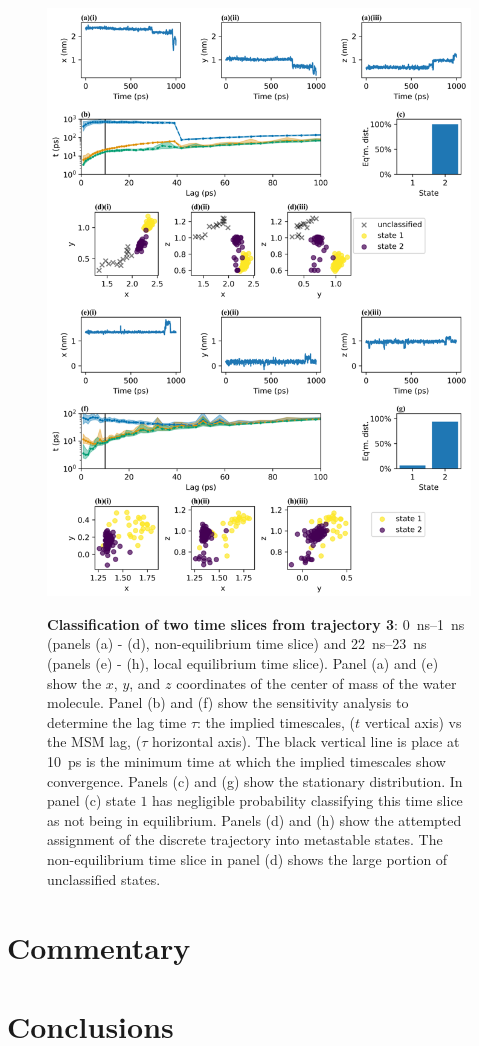 \begin{figure}[p]
    \centering
    \caption{\textbf{Classification of two time slices from trajectory 3}: \SIrange{0}{1}{\nano\second} (panels (a) - (d), non-equilibrium time slice) and \SIrange{22}{23}{\nano\second} (panels (e) - (h), local equilibrium time slice). Panel (a) and (e) show the $x$, $y$, and $z$ coordinates of the center of mass of the water molecule. Panel (b) and (f) show the sensitivity analysis to determine the lag time $\tau$: the implied timescales, ($t$ vertical axis) vs the MSM lag, ($\tau$ horizontal axis). The black vertical line is place at \SI{10}{\pico\second} is the minimum time at which the implied timescales show convergence. Panels (c) and (g) show the stationary distribution. In panel (c) state $1$ has negligible probability classifying this time slice as not being in equilibrium. Panels (d) and (h) show the attempted assignment of the discrete trajectory into metastable states. The non-equilibrium time slice in panel (d) shows the large portion of unclassified states.}
    \includegraphics{chapters/water_hopping/figures/Fig_S11.png}
    \label{fig:wat_msm_classification}
\end{figure}

\section{Commentary}

\section{Conclusions}



